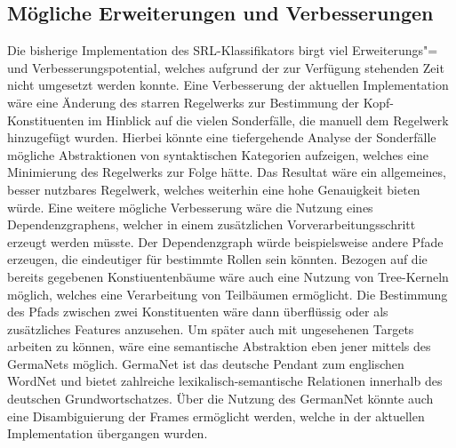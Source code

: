 \documentclass[12pt]{article}
\begin{document}
\subsection{Mögliche Erweiterungen und Verbesserungen}

Die bisherige Implementation des SRL-Klassifikators birgt viel Erweiterungs"= und Verbesserungspotential, welches aufgrund der zur Verfügung stehenden Zeit nicht umgesetzt werden konnte.
Eine Verbesserung der aktuellen Implementation wäre eine Änderung des starren Regelwerks zur Bestimmung der Kopf-Konstituenten im Hinblick auf die vielen Sonderfälle, die manuell dem Regelwerk hinzugefügt wurden. Hierbei könnte eine tiefergehende Analyse der Sonderfälle mögliche Abstraktionen von syntaktischen Kategorien aufzeigen, welches eine Minimierung des Regelwerks zur Folge hätte. Das Resultat wäre ein allgemeines, besser nutzbares Regelwerk, welches weiterhin eine hohe Genauigkeit bieten würde.
Eine weitere mögliche Verbesserung wäre die Nutzung eines Dependenzgraphens, welcher in einem zusätzlichen Vorverarbeitungsschritt erzeugt werden müsste. Der Dependenzgraph würde beispielsweise andere Pfade erzeugen, die eindeutiger für bestimmte Rollen sein könnten. 
Bezogen auf die bereits gegebenen Konstiuentenbäume wäre auch eine Nutzung von Tree-Kerneln möglich, welches eine Verarbeitung von Teilbäumen ermöglicht. Die Bestimmung des Pfads zwischen zwei Konstituenten wäre dann überflüssig oder als zusätzliches Features anzusehen.
Um später auch mit ungesehenen Targets arbeiten zu können, wäre eine semantische Abstraktion eben jener mittels des GermaNets\citep{Hamp97germanet} möglich. GermaNet ist das deutsche Pendant zum englischen WordNet\citep{Miller1990} und bietet zahlreiche lexikalisch-semantische Relationen innerhalb des deutschen Grundwortschatzes. Über die Nutzung des GermanNet könnte auch eine Disambiguierung der Frames ermöglicht werden, welche in der aktuellen Implementation übergangen wurden.
 
\newpage


\end{document}
